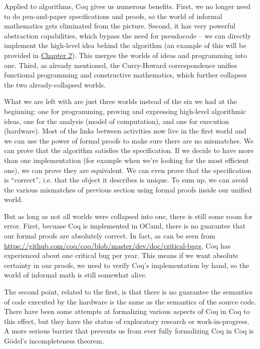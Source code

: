 \documentclass[declaration,mgr,english,shortabstract]{iithesis}
\begin{document}
Applied to algorithms, Coq gives us numerous benefits. First, we no longer need to do pen-and-paper specifications and proofs, so the world of informal mathematics gets eliminated from the picture. Second, it has very powerful abstraction capabilities, which bypass the need for pseudocode -- we can directly implement the high-level idea behind the algorithm (an example of this will be provided in \hyperref[ch2]{Chapter 2}). This merges the worlds of ideas and programming into one. Third, as already mentioned, the Curry-Howard correspondence unifies functional programming and constructive mathematics, which further collapses the two already-collapsed worlds.

What we are left with are just three worlds instead of the six we had at the beginning: one for programming, proving and expressing high-level algorithmic ideas, one for the analysis (model of computation), and one for execution (hardware). Most of the links between activities now live in the first world and we can use the power of formal proofs to make sure there are no mismatches. We can prove that the algorithm satisfies the specification. If we decide to have more than one implementation (for example when we're looking for the most efficient one), we can prove they are equivalent. We can even prove that the specification is ``correct'', i.e. that the object it describes is unique. To sum up, we can avoid the various mismatches of previous section using formal proofs inside our unified world.

But as long as not all worlds were collapsed into one, there is still some room for error. First, becuase Coq is implemented in OCaml, there is no guarantee that our formal proofs are absolutely correct. In fact, as can be seen from \url{https://github.com/coq/coq/blob/master/dev/doc/critical-bugs}, Coq has experienced about one critical bug per year. This means if we want absolute certainty in our proofs, we need to verify Coq's implementation by hand, so the world of informal math is still somewhat alive.

The second point, related to the first, is that there is no guarantee the semantics of code executed by the hardware is the same as the semantics of the source code. There have been some attempts at formalizing various aspects of Coq in Coq \cite{CoqInCoq} \cite{CoqCoqCorrect} to this effect, but they have the status of exploratory research or work-in-progress. A more serious barrier that prevents us from ever fully formalizing Coq in Coq is G\"{o}del's incompleteness theorem.
\end{document}
